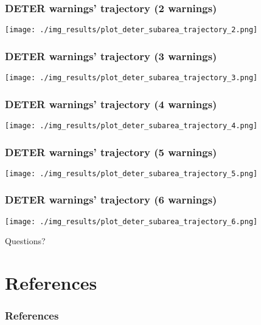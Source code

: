 \documentclass{beamer}
\begin{document}
\begin{frame}
    \frametitle{DETER warnings' trajectory (2 warnings) }
    \texttt{[image: ./img\_results/plot\_deter\_subarea\_trajectory\_2.png]}
\end{frame}

\begin{frame}
    \frametitle{DETER warnings' trajectory (3 warnings) }
    \texttt{[image: ./img\_results/plot\_deter\_subarea\_trajectory\_3.png]}
\end{frame}

\begin{frame}
    \frametitle{DETER warnings' trajectory (4 warnings) }
    \texttt{[image: ./img\_results/plot\_deter\_subarea\_trajectory\_4.png]}
\end{frame}

\begin{frame}
    \frametitle{DETER warnings' trajectory (5 warnings) }
    \texttt{[image: ./img\_results/plot\_deter\_subarea\_trajectory\_5.png]}
\end{frame}

\begin{frame}
    \frametitle{DETER warnings' trajectory (6 warnings) }
    \texttt{[image: ./img\_results/plot\_deter\_subarea\_trajectory\_6.png]}
\end{frame}





\begin{frame}
    Questions?
\end{frame}




\section{References}

\begin{frame}[t, allowframebreaks]
    \frametitle{References}
    
    
\end{frame}
\end{document}
